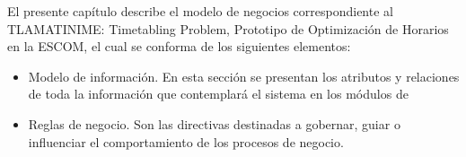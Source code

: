 
El presente capítulo describe el modelo de negocios correspondiente al TLAMATINIME: Timetabling Problem, Prototipo de Optimización de Horarios
en la ESCOM, el cual se conforma de los siguientes elementos:

\begin{itemize}
    \item Modelo de información. En esta sección se presentan los atributos y relaciones de toda la información que contemplará el sistema en los módulos de %

    \item Reglas de negocio. Son las directivas destinadas a gobernar, guiar o influenciar el comportamiento de los procesos de negocio.
\end{itemize}

